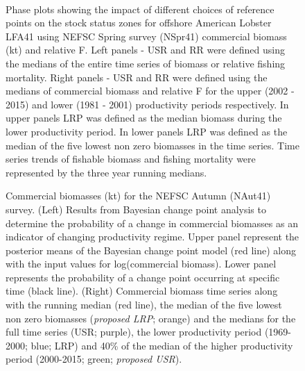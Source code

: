 \documentclass[11pt]{article}
\newcommand{\e}{/backup/bio_data/bio.lobster/figures/} %
\begin{document}
\begin{landscape}
\begin{figure}
\centering
        \\

      \caption{Phase plots showing the impact of different choices of reference points on the stock status zones for offshore American Lobster LFA41 using NEFSC Spring survey (NSpr41) commercial biomass (kt) and relative F. Left panels  - USR and RR were defined using the medians of the entire time series of biomass or relative fishing mortality. Right panels - USR and RR were defined using the medians of commercial biomass and relative F for the upper (2002 - 2015) and lower (1981 - 2001) productivity periods respectively. In upper panels LRP was defined as the median biomass during the lower productivity period. In lower panels LRP was defined as the median of the five lowest non zero biomasses in the time series. Time series trends of fishable biomass and fishing mortality were represented by the three year running medians. }

\end{figure}
\end{landscape}




\begin{landscape}
\begin{figure}
\centering
       \caption{Commercial biomasses (kt) for the NEFSC Autumn (NAut41) survey. (Left) Results from Bayesian change point analysis to determine the probability of a change in commercial biomasses as an indicator of changing productivity regime. Upper panel represent the posterior means of the Bayesian change point model (red line) along with the input values for log(commercial biomass). Lower panel represents the probability of a change point occurring at specific time (black line). (Right) Commercial biomass time series along with the running median (red line), the median of the five lowest non zero biomasses (\emph{proposed LRP}; orange) and the medians for the full time series (USR; purple), the lower productivity period (1969-2000; blue; LRP) and 40\% of the median of the higher productivity period (2000-2015; green; \emph{proposed USR}). }

\end{figure}
\end{landscape}
\end{document}
